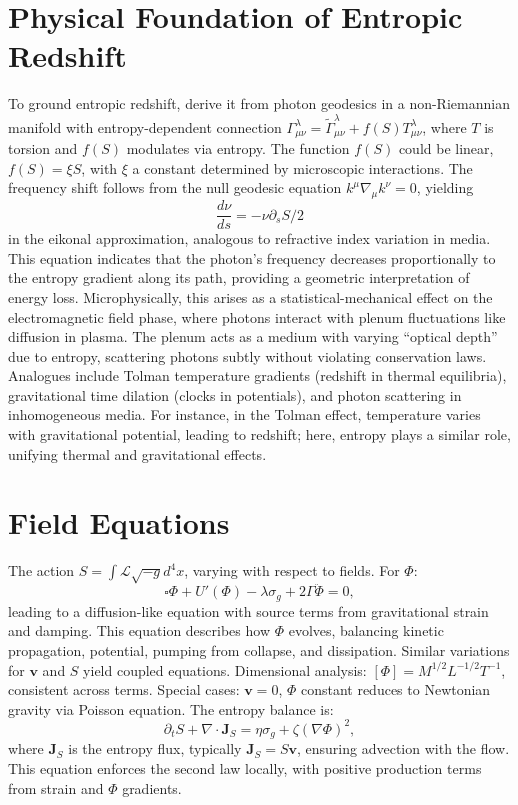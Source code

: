 \documentclass[11pt]{article}
\theoremstyle{plain}
\theoremstyle{definition}
\begin{document}
\section{Physical Foundation of Entropic Redshift}
To ground entropic redshift, derive it from photon geodesics in a non-Riemannian manifold with entropy-dependent connection $\Gamma^\lambda_{\mu\nu} = \tilde{\Gamma}^\lambda_{\mu\nu} + f(S) T^\lambda_{\mu\nu}$, where $T$ is torsion and $f(S)$ modulates via entropy. The function $f(S)$ could be linear, $f(S) = \xi S$, with $\xi$ a constant determined by microscopic interactions.
The frequency shift follows from the null geodesic equation $k^\mu \nabla_\mu k^\nu = 0$, yielding 
\begin{equation}
\frac{d\nu}{ds} = -\nu \partial_s S / 2
\label{eq:freq_shift}
\end{equation}
in the eikonal approximation, analogous to refractive index variation in media. This equation indicates that the photon's frequency decreases proportionally to the entropy gradient along its path, providing a geometric interpretation of energy loss.
Microphysically, this arises as a statistical-mechanical effect on the electromagnetic field phase, where photons interact with plenum fluctuations like diffusion in plasma. The plenum acts as a medium with varying ``optical depth'' due to entropy, scattering photons subtly without violating conservation laws.
Analogues include Tolman temperature gradients (redshift in thermal equilibria), gravitational time dilation (clocks in potentials), and photon scattering in inhomogeneous media. For instance, in the Tolman effect, temperature varies with gravitational potential, leading to redshift; here, entropy plays a similar role, unifying thermal and gravitational effects.
\section{Field Equations}
The action $S = \int \mathcal{L} \sqrt{-g} d^4x$, varying with respect to fields. For $\Phi$:
\begin{equation}
\square \Phi + U'(\Phi) - \lambda \sigma_g + 2\Gamma \ddot{\Phi} = 0,
\label{eq:phi-eq}
\end{equation}
leading to a diffusion-like equation with source terms from gravitational strain and damping. This equation describes how $\Phi$ evolves, balancing kinetic propagation, potential, pumping from collapse, and dissipation.
Similar variations for $\bm{v}$ and $S$ yield coupled equations. Dimensional analysis: $[\Phi] = M^{1/2} L^{-1/2} T^{-1}$, consistent across terms.
Special cases: $\bm{v} = 0$, $\Phi$ constant reduces to Newtonian gravity via Poisson equation.
The entropy balance is:
\begin{equation}
\partial_t S + \nabla \cdot \bm{J}_S = \eta \sigma_g + \zeta (\nabla \Phi)^2,
\label{eq:entropy}
\end{equation}
where $\bm{J}_S$ is the entropy flux, typically $\bm{J}_S = S \bm{v}$, ensuring advection with the flow. This equation enforces the second law locally, with positive production terms from strain and $\Phi$ gradients.
\end{document}
